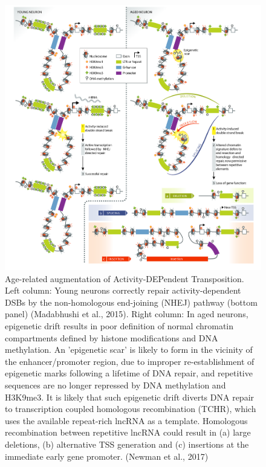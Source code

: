 \documentclass[onehalf,12pt]{beavtex}
\begin{document}
  \begin{figure}
  
  {\centering \includegraphics[width=1\linewidth, ]{./figure/introduction/ADEPT} 
  
  }
  
  \caption[Age-related augmentation of Activity DEPendent Transposition]{Age-related augmentation of Activity-DEPendent Transposition.  Left column: Young neurons correctly repair activity-dependent DSBs by the non-homologous end-joining (NHEJ) pathway (bottom panel) (Madabhushi et al., 2015). Right column: In aged neurons, epigenetic drift results in poor definition of normal chromatin compartments defined by histone modifications and DNA methylation. An 'epigenetic scar' is likely to form in the vicinity of the enhancer/promoter region, due to improper re-establishment of epigenetic marks following a lifetime of DNA repair, and repetitive sequences are no longer repressed by DNA methylation and H3K9me3. It is likely that such epigenetic drift diverts DNA repair to transcription coupled homologous recombination (TCHR), which uses the available repeat-rich lncRNA as a template.  Homologous recombination between repetitive lncRNA could result in (a) large deletions, (b) alternative TSS generation and (c) insertions at the immediate early gene promoter. (Newman et al., 2017)}\label{fig:ADEPT}
  \end{figure}
  
\end{document}

